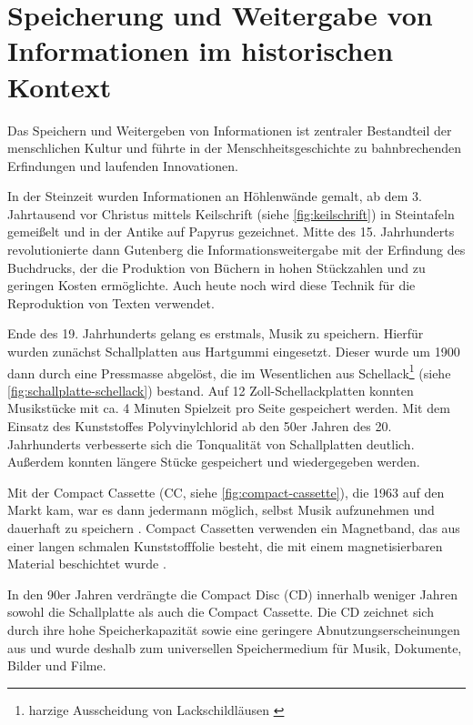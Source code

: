 \section{Speicherung und Weitergabe von Informationen im historischen Kontext}
\label{sec:einleitung}

Das Speichern und Weitergeben von Informationen ist zentraler Bestandteil der
menschlichen Kultur und führte in der Menschheitsgeschichte zu bahnbrechenden
Erfindungen und laufenden Innovationen.

In der Steinzeit wurden Informationen an Höhlenwände gemalt, ab dem 3.
Jahrtausend vor Christus mittels Keilschrift (siehe \autoref{fig:keilschrift})
in Steintafeln gemeißelt und in der Antike auf Papyrus gezeichnet. Mitte des 15.
Jahrhunderts revolutionierte dann Gutenberg die Informationsweitergabe mit der
Erfindung des Buchdrucks, der die Produktion von Büchern in hohen Stückzahlen
und zu geringen Kosten ermöglichte. Auch heute noch wird diese Technik für die
Reproduktion von Texten verwendet.

Ende des 19. Jahrhunderts gelang es erstmals, Musik zu speichern. Hierfür wurden
zunächst Schallplatten aus Hartgummi eingesetzt. Dieser wurde um 1900 dann durch
eine Pressmasse abgelöst, die im Wesentlichen aus Schellack\footnote{harzige
Ausscheidung von Lackschildläusen \cite{schellack}} (siehe
\autoref{fig:schallplatte-schellack}) bestand. Auf 12 Zoll-Schellackplatten
konnten Musikstücke mit ca. 4 Minuten Spielzeit pro Seite gespeichert werden.
Mit dem Einsatz des Kunststoffes Polyvinylchlorid ab den 50er Jahren des 20.
Jahrhunderts verbesserte sich die Tonqualität von Schallplatten deutlich.
Außerdem konnten längere Stücke gespeichert und wiedergegeben werden.
\cite{schallplatte1}

Mit der Compact Cassette (CC, siehe \autoref{fig:compact-cassette}), die 1963
auf den Markt kam, war es dann jedermann möglich, selbst Musik aufzunehmen und
dauerhaft zu speichern \cite{kassette1}. Compact Cassetten verwenden ein
Magnetband, das aus einer langen schmalen Kunststofffolie besteht, die mit einem
magnetisierbaren Material beschichtet wurde \cite{kassette2}.

In den 90er Jahren verdrängte  die Compact Disc (CD) innerhalb weniger Jahren
sowohl die Schallplatte als auch die Compact Cassette. Die CD zeichnet sich
durch ihre hohe Speicherkapazität sowie eine geringere Abnutzungserscheinungen
aus und wurde deshalb zum universellen Speichermedium für Musik, Dokumente,
Bilder und Filme. \cite{cd_durchbruch}

